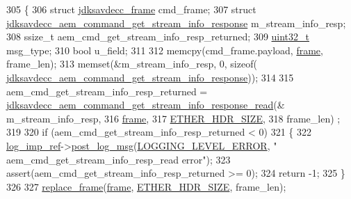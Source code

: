 \begin{DoxyCode}
305 \{
306     \textcolor{keyword}{struct }\hyperlink{structjdksavdecc__frame}{jdksavdecc\_frame} cmd\_frame;
307     \textcolor{keyword}{struct }\hyperlink{structjdksavdecc__aem__command__get__stream__info__response}{jdksavdecc\_aem\_command\_get\_stream\_info\_response} 
      m\_stream\_info\_resp;
308     ssize\_t aem\_cmd\_get\_stream\_info\_resp\_returned;
309     \hyperlink{parse_8c_a6eb1e68cc391dd753bc8ce896dbb8315}{uint32\_t} msg\_type;
310     \textcolor{keywordtype}{bool} u\_field;
311 
312     memcpy(cmd\_frame.payload, \hyperlink{gst__avb__playbin_8c_ac8e710e0b5e994c0545d75d69868c6f0}{frame}, frame\_len);
313     memset(&m\_stream\_info\_resp, 0, \textcolor{keyword}{sizeof}(
      \hyperlink{structjdksavdecc__aem__command__get__stream__info__response}{jdksavdecc\_aem\_command\_get\_stream\_info\_response}));
314 
315     aem\_cmd\_get\_stream\_info\_resp\_returned = 
      \hyperlink{group__command__get__stream__info__response_ga4bcf5e9c7ef91a7dfc11835f94bf9667}{jdksavdecc\_aem\_command\_get\_stream\_info\_response\_read}(&
      m\_stream\_info\_resp,
316                                                                                                  
      \hyperlink{gst__avb__playbin_8c_ac8e710e0b5e994c0545d75d69868c6f0}{frame},
317                                                                                                  
      \hyperlink{namespaceavdecc__lib_a6c827b1a0d973e18119c5e3da518e65ca9512ad9b34302ba7048d88197e0a2dc0}{ETHER\_HDR\_SIZE},
318                                                                                                  frame\_len)
      ;
319 
320     \textcolor{keywordflow}{if} (aem\_cmd\_get\_stream\_info\_resp\_returned < 0)
321     \{
322         \hyperlink{namespaceavdecc__lib_acbe3e2a96ae6524943ca532c87a28529}{log\_imp\_ref}->\hyperlink{classavdecc__lib_1_1log_a68139a6297697e4ccebf36ccfd02e44a}{post\_log\_msg}(\hyperlink{namespaceavdecc__lib_a501055c431e6872ef46f252ad13f85cdaf2c4481208273451a6f5c7bb9770ec8a}{LOGGING\_LEVEL\_ERROR}, \textcolor{stringliteral}{"
      aem\_cmd\_get\_stream\_info\_resp\_read error"});
323         assert(aem\_cmd\_get\_stream\_info\_resp\_returned >= 0);
324         \textcolor{keywordflow}{return} -1;
325     \}
326 
327     \hyperlink{classavdecc__lib_1_1descriptor__base__imp_a482fe95208e9e14885e28e73e7be2c49}{replace\_frame}(\hyperlink{gst__avb__playbin_8c_ac8e710e0b5e994c0545d75d69868c6f0}{frame}, \hyperlink{namespaceavdecc__lib_a6c827b1a0d973e18119c5e3da518e65ca9512ad9b34302ba7048d88197e0a2dc0}{ETHER\_HDR\_SIZE}, frame\_len);

\end{DoxyCode}
